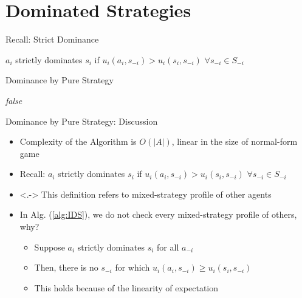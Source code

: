 \documentclass[11pt,aspectratio=169]{beamer}
\begin{document}
 \section{Dominated Strategies}
  
  \begin{frame}{Recall: Strict Dominance}
   \begin{center}
    $a_i$ \alert{strictly dominates} $s_i$ if $u_i(a_i, s_{-i}) > u_i(s_i,s_{-i})$ $\forall s_{-i} \in S_{-i}$
   \end{center}
  \end{frame}
  
  
  \begin{frame}{Dominance by Pure Strategy}
   \begin{algorithm*}[H]
    \Return \textit{false}\;
   \label{alg:IDS}
   \caption{Determine whether $s_i$ is strictly dominated by any pure strategy}
   \end{algorithm*}
  \end{frame}
  
    
  \begin{frame}{Dominance by Pure Strategy: Discussion}
   \begin{itemize}[<+->]
   \setlength{\itemsep}{1.2em}
    \item Complexity of the Algorithm is $O(\vert A\vert)$, linear in the size of normal-form game
    \item Recall: $a_i$ \alert{strictly dominates} $s_i$ if $u_i(a_i, s_{-i}) > u_i(s_i,s_{-i})$ $\forall s_{-i} \in S_{-i}$
    \item<.-> This definition refers to mixed-strategy profile of other agents
    \item In Alg. (\ref{alg:IDS}), we do not check every mixed-strategy profile of others, why?
    \begin{itemize}
    \setlength{\itemsep}{0.8em}
     \item Suppose $a_i$ strictly dominates $s_i$ for all $a_{-i}$
     \item Then, there is no $s_{-i}$ for which $u_i(a_i, s_{-i}) \ge u_i(s_i, s_{-i})$
     \item This holds because of the linearity of expectation
    \end{itemize}
   \end{itemize}
  \end{frame}
  
\end{document}
